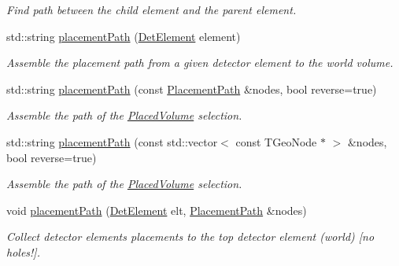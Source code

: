 \begin{DoxyCompactItemize}
\begin{DoxyCompactList}\small\item\em Find path between the child element and the parent element. \item\end{DoxyCompactList}\item 
std::string \hyperlink{namespace_d_d4hep_1_1_geometry_1_1_detector_tools_a1ca0d88ab941b6dde4776c6b3b893fb6}{placementPath} (\hyperlink{class_d_d4hep_1_1_geometry_1_1_det_element}{DetElement} element)
\begin{DoxyCompactList}\small\item\em Assemble the placement path from a given detector element to the world volume. \item\end{DoxyCompactList}\item 
std::string \hyperlink{namespace_d_d4hep_1_1_geometry_1_1_detector_tools_a792502fe2b1afaa030b9697151824452}{placementPath} (const \hyperlink{namespace_d_d4hep_1_1_geometry_1_1_detector_tools_a6cc33285199e04dd336a33e6e62925e6}{PlacementPath} \&nodes, bool reverse=true)
\begin{DoxyCompactList}\small\item\em Assemble the path of the \hyperlink{class_d_d4hep_1_1_geometry_1_1_placed_volume}{PlacedVolume} selection. \item\end{DoxyCompactList}\item 
std::string \hyperlink{namespace_d_d4hep_1_1_geometry_1_1_detector_tools_ad25502414dd3799806729e2d72f9a34a}{placementPath} (const std::vector$<$ const TGeoNode $\ast$ $>$ \&nodes, bool reverse=true)
\begin{DoxyCompactList}\small\item\em Assemble the path of the \hyperlink{class_d_d4hep_1_1_geometry_1_1_placed_volume}{PlacedVolume} selection. \item\end{DoxyCompactList}\item 
void \hyperlink{namespace_d_d4hep_1_1_geometry_1_1_detector_tools_a4643e9605448f9652b2c95e6ef5619c3}{placementPath} (\hyperlink{class_d_d4hep_1_1_geometry_1_1_det_element}{DetElement} elt, \hyperlink{namespace_d_d4hep_1_1_geometry_1_1_detector_tools_a6cc33285199e04dd336a33e6e62925e6}{PlacementPath} \&nodes)
\begin{DoxyCompactList}\small\item\em Collect detector elements placements to the top detector element (world) \mbox{[}no holes!\mbox{]}. \item\end{DoxyCompactList}\item 

\end{DoxyCompactItemize}
